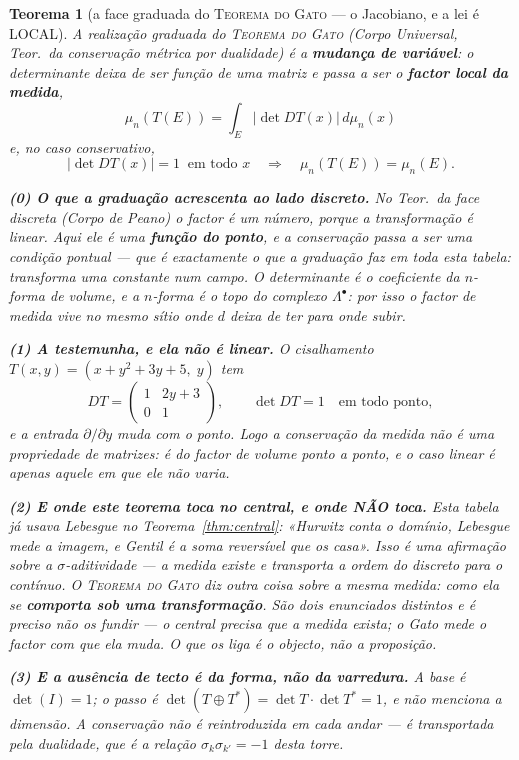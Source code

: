 \documentclass[11pt,a4paper]{article}
\newtheorem{teorema}{Teorema}
\begin{document}
\begin{teorema}[a face graduada do \textsc{Teorema do Gato} --- o
Jacobiano, e a lei é LOCAL]\label{thm:medida-jacobiano}
A realização graduada do \textsc{Teorema do Gato} (\emph{Corpo
Universal}, Teor.~da conservação métrica por dualidade) é a
\textbf{mudança de variável}: o determinante deixa de ser função de uma matriz e passa a
ser o \textbf{factor local da medida},
\[
\boxed{\;\mu_{n}(T(E))=\int_{E}|\det DT(x)|\,d\mu_{n}(x)\;}
\]
e, no caso conservativo,
\[
|\det DT(x)|=1\;\;\text{em todo }x
\quad\Longrightarrow\quad
\mu_{n}(T(E))=\mu_{n}(E).
\]

\textbf{(0) O que a graduação acrescenta ao lado discreto.} No
Teor.~da face discreta (\emph{Corpo de Peano}) o factor é \emph{um}
número, porque a transformação é linear. Aqui ele é uma \textbf{função
do ponto}, e a conservação passa a ser uma condição \emph{pontual} ---
que é exactamente o que a graduação faz em toda esta tabela: transforma
uma constante num campo. O determinante é o coeficiente da $n$-forma de
volume, e a $n$-forma é o topo do complexo $\Lambda^{\bullet}$: por isso
o factor de medida vive no mesmo sítio onde $d$ deixa de ter para onde
subir.

\textbf{(1) A testemunha, e ela não é linear.} O cisalhamento
$T(x,y)=(x+y^{2}+3y+5,\;y)$ tem
\[
DT=\begin{pmatrix} 1 & 2y+3\\ 0 & 1\end{pmatrix},
\qquad \det DT=1\quad\text{em todo ponto},
\]
e a entrada $\partial/\partial y$ \emph{muda} com o ponto. Logo a
conservação da medida não é uma propriedade de matrizes: é do factor de
volume ponto a ponto, e o caso linear é apenas aquele em que ele não
varia.

\textbf{(2) E onde este teorema toca no central, e onde NÃO toca.} Esta
tabela já usava Lebesgue no Teorema~\ref{thm:central}: «Hurwitz conta o
domínio, Lebesgue mede a imagem, e Gentil é a soma reversível que os
casa». Isso é uma afirmação sobre a $\sigma$-aditividade --- a medida
existe e transporta a ordem do discreto para o contínuo. O
\textsc{Teorema do Gato} diz outra coisa sobre a \emph{mesma} medida:
como ela se \textbf{comporta sob uma transformação}. São dois enunciados
distintos e é preciso não os fundir --- o central precisa que a medida
exista; o Gato mede o factor com que ela muda. O que os liga é o objecto,
não a proposição.

\textbf{(3) E a ausência de tecto é da forma, não da varredura.} A base
é $\det(I)=1$; o passo é
$\det(T\oplus T^{\ast})=\det T\cdot\det T^{\ast}=1$, e não menciona a
dimensão. A conservação não é reintroduzida em cada andar --- é
transportada pela dualidade, que é a relação $\sigma_{k}\sigma_{k'}=-1$
desta torre.


\end{teorema}
\end{document}

